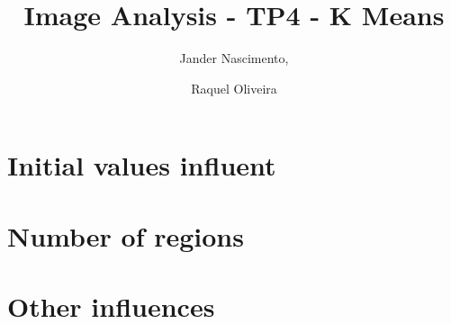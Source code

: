 \documentclass{article}
\begin{document}
\title{Image Analysis - TP4 - K Means}

\author{Jander Nascimento, 
\and Raquel Oliveira}

\maketitle

\section{Initial values influent}
\section{Number of regions}
\section{Other influences}
\end{document}
